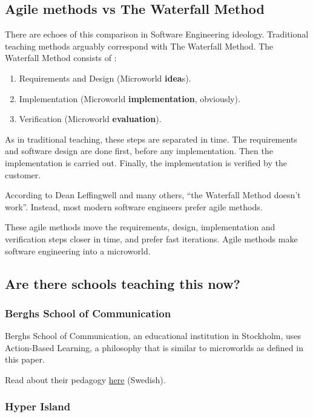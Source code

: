 \subsection{Agile methods vs The Waterfall Method}

There are echoes of this comparison in Software Engineering ideology.
Traditional teaching methods arguably correspond with The Waterfall
Method. The Waterfall Method consists of \cite{wiki:waterfall}: 

\begin{enumerate}
\item Requirements and Design (Microworld \textbf{idea}s). 
\item Implementation (Microworld \textbf{implementation}, obviously). 
\item Verification (Microworld \textbf{evaluation}).
\end{enumerate}

As in traditional teaching, these steps are separated in time. The
requirements and software design are done first, before any
implementation. Then the implementation is carried out. Finally, the
implementation is verified by the customer.

According to Dean Leffingwell and many others, ``the Waterfall Method
doesn't work''\cite{leffingwell}. Instead, most modern software engineers
prefer agile methods.

These agile methods move the requirements, design, implementation and
verification steps closer in time, and prefer fast iterations. Agile
methods make software engineering into a microworld.

\subsection{Are there schools teaching this now?}

\subsubsection{Berghs School of Communication}

Berghs School of Communication, an educational institution in Stockholm, uses Action-Based Learning, a philosophy that is similar to microworlds as defined in this paper.

Read about their pedagogy \href{http://www.berghs.se/content/berghs-pedagogik}{here} (Swedish). 

\subsubsection{Hyper Island}

